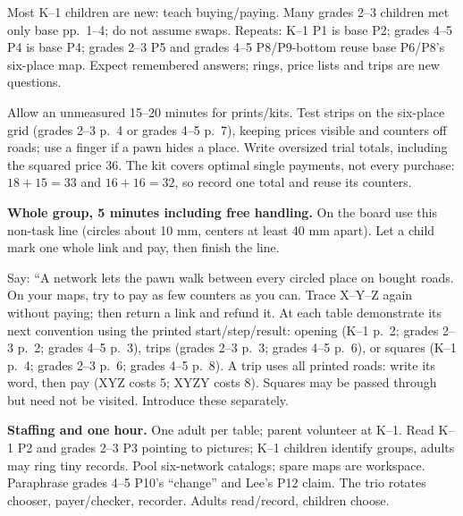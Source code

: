 \documentclass[11pt]{article}
\begin{document}
Most K--1 children are new: teach buying/paying. Many grades 2--3 children met only base pp.~1--4; do not assume swaps. Repeats: K--1 P1 is base P2; grades 4--5 P4 is base P4; grades 2--3 P5 and grades 4--5 P8/P9-bottom reuse base P6/P8's six-place map. Expect remembered answers; rings, price lists and trips are new questions.

Allow an unmeasured 15--20 minutes for prints/kits. Test strips on the six-place grid (grades 2--3 p.~4 or grades 4--5 p.~7), keeping prices visible and counters off roads; use a finger if a pawn hides a place. Write oversized trial totals, including the squared price 36. The kit covers optimal single payments, not every purchase: $18+15=33$ and $16+16=32$, so record one total and reuse its counters.

\textbf{Whole group, 5 minutes including free handling.} On the board use this non-task line (circles about 10 mm, centers at least 40 mm apart). Let a child mark one whole link and pay, then finish the line.
\begin{center}
\end{center}
Say: ``A network lets the pawn walk between every circled place on bought roads. On your maps, try to pay as few counters as you can. Trace X--Y--Z again without paying; then return a link and refund it. At each table demonstrate its next convention using the printed start/step/result: opening (K--1 p.~2; grades 2--3 p.~2; grades 4--5 p.~3), trips (grades 2--3 p.~3; grades 4--5 p.~6), or squares (K--1 p.~4; grades 2--3 p.~6; grades 4--5 p.~8). A trip uses all printed roads: write its word, then pay (XYZ costs 5; XYZY costs 8). Squares may be passed through but need not be visited. Introduce these separately.

\textbf{Staffing and one hour.} One adult per table; parent volunteer at K--1. Read K--1 P2 and grades 2--3 P3 pointing to pictures; K--1 children identify groups, adults may ring tiny records. Pool six-network catalogs; spare maps are workspace. Paraphrase grades 4--5 P10's ``change'' and Lee's P12 claim. The trio rotates chooser, payer/checker, recorder. Adults read/record, children choose.
\end{document}
